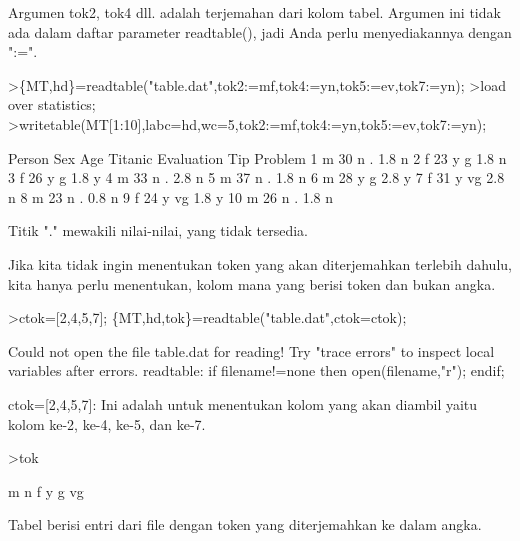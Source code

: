 \documentclass[a4paper,10pt]{article}
\begin{document}
\begin{eulernotebook}
\begin{eulercomment}
\begin{eulercomment}
\begin{eulercomment}
Argumen tok2, tok4 dll. adalah terjemahan dari kolom tabel. Argumen
ini tidak ada dalam daftar parameter readtable(), jadi Anda perlu
menyediakannya dengan ":=".
\end{eulercomment}
\begin{eulerprompt}
>\{MT,hd\}=readtable("table.dat",tok2:=mf,tok4:=yn,tok5:=ev,tok7:=yn);
>load over statistics;
>writetable(MT[1:10],labc=hd,wc=5,tok2:=mf,tok4:=yn,tok5:=ev,tok7:=yn);
\end{eulerprompt}
\begin{euleroutput}
   Person  Sex  Age Titanic Evaluation  Tip Problem
        1    m   30       n          .  1.8       n
        2    f   23       y          g  1.8       n
        3    f   26       y          g  1.8       y
        4    m   33       n          .  2.8       n
        5    m   37       n          .  1.8       n
        6    m   28       y          g  2.8       y
        7    f   31       y         vg  2.8       n
        8    m   23       n          .  0.8       n
        9    f   24       y         vg  1.8       y
       10    m   26       n          .  1.8       n
\end{euleroutput}
\begin{eulercomment}
Titik "." mewakili nilai-nilai, yang tidak tersedia.

Jika kita tidak ingin menentukan token yang akan diterjemahkan
terlebih dahulu, kita hanya perlu menentukan, kolom mana yang berisi
token dan bukan angka.
\end{eulercomment}
\begin{eulerprompt}
>ctok=[2,4,5,7]; \{MT,hd,tok\}=readtable("table.dat",ctok=ctok);
\end{eulerprompt}
\begin{euleroutput}
  Could not open the file
  table.dat
  for reading!
  Try "trace errors" to inspect local variables after errors.
  readtable:
      if filename!=none then open(filename,"r"); endif;
\end{euleroutput}
\begin{eulercomment}
ctok=[2,4,5,7]: Ini adalah untuk menentukan kolom yang akan diambil
yaitu kolom ke-2, ke-4, ke-5, dan ke-7.
\end{eulercomment}
\begin{eulerprompt}
>tok
\end{eulerprompt}
\begin{euleroutput}
  m
  n
  f
  y
  g
  vg
\end{euleroutput}
\begin{eulercomment}
Tabel berisi entri dari file dengan token yang diterjemahkan ke dalam
angka.


\end{eulercomment}
\end{eulercomment}
\end{eulercomment}
\end{eulernotebook}
\end{document}
